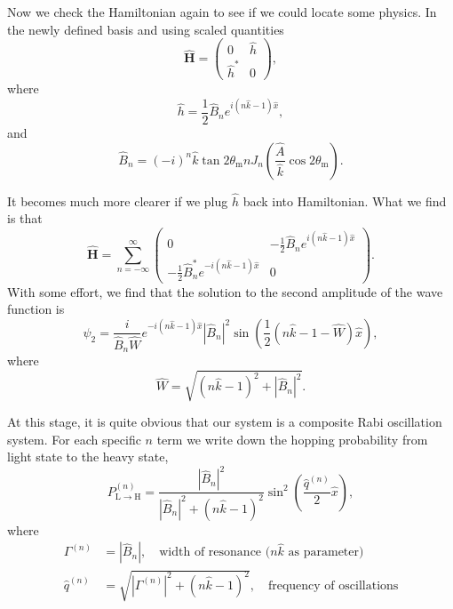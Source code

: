 


Now we check the Hamiltonian again to see if we could locate some physics. In the newly defined basis and using scaled quantities
\begin{equation}
   \hat{\mathbf{H}} = \begin{pmatrix}
   0 & \hat h \\
   \hat h^* & 0
   \end{pmatrix}, 
\end{equation}
where
\begin{equation}
   \hat h = \frac{1}{2} \hat B_n e^{i(n \hat k - 1)\hat x}, 
\end{equation}
and
\begin{equation}
   \hat B_n = (-i)^n \hat k \tan 2\theta_{\mathrm{m}} n J_n (\frac{\hat A}{\hat k} \cos 2\theta_{\mathrm{m}}). 
\end{equation}

It becomes much more clearer if we plug $\hat h$ back into Hamiltonian. What we find is that
\begin{equation}
   \hat{\mathbf{H}} = \sum_{n=-\infty}^{\infty} \begin{pmatrix}
   0 & -\frac{1}{2} \hat B_n e^{i(n \hat k - 1)\hat x} \\
   -\frac{1}{2} \hat B_n^* e^{-i(n \hat k - 1)\hat x} & 0
   \end{pmatrix}.
\end{equation}
With some effort, we find that the solution to the second amplitude of the wave function is
\begin{equation}
   \psi_2 = \frac{i}{ \hat B_n \hat W} e^{-i(n \hat k -1)\hat x}  \left\vert \hat B_n \right\vert^2 \sin\left( \frac{1}{2}(n \hat k -1 -\hat W) \hat x  \right),
\end{equation}
where
\begin{equation}
   \hat W = \sqrt{ (n \hat k - 1)^2 + \left\vert \hat B_n \right\vert^2 }. 
\end{equation}
   

At this stage, it is quite obvious that our system is a composite Rabi oscillation system. For each specific $n$ term we write down the hopping probability from light state to the heavy state,
\begin{equation}
   P_{\mathrm{L}\to\mathrm{H}}^{(n)} = \frac{ \left\lvert \hat B_{n}  \right\rvert^2 }{ \left\lvert   \hat B_{n}  \right\rvert^2 + ( n \hat k - 1 )^2  } \sin^2 \left( \frac{ \hat q^{(n)} }{2} \hat x \right),
\end{equation}
where
\begin{align}
   \Gamma^{(n)} &= \left\lvert \hat B_{n} \right\rvert, \quad \text{width of resonance ($n\hat k$ as parameter)} \\
   \hat q^{(n)} &= \sqrt{\left\lvert  \Gamma^{(n)} \right\rvert^2 + ( n \hat k - 1 )^2},\quad \text{frequency of oscillations}
\end{align}

